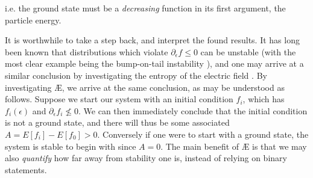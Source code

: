 i.e. the ground state must be a \textit{decreasing} function in its first argument, the particle energy. \par 
It is worthwhile to take a step back, and interpret the found results. It has long been known that distributions which violate $\partial_\epsilon f \leq 0$ can be unstable \cite{taylor1963some} (with the most clear example being the bump-on-tail instability \cite{drtjmmond1962non}), and one may arrive at a similar conclusion by investigating the entropy of the electric field \cite{minardi1985thermodynamics}. By  investigating \AE{}, we arrive at the same conclusion, as may be understood as follows. Suppose we start our system with an initial condition $f_i$, which has $f_i(\epsilon)$ and $\partial_\epsilon f_i \nleq 0$. We can then immediately conclude that the initial condition is not a ground state, and there will thus be some associated $A = E[f_i] - E[f_0]>0$. Conversely if one were to start with a ground state, the system is stable to begin with since $A=0$. The main benefit of \AE{} is that we may also \textit{quantify} how far away from stability one is, instead of relying on binary statements. 

